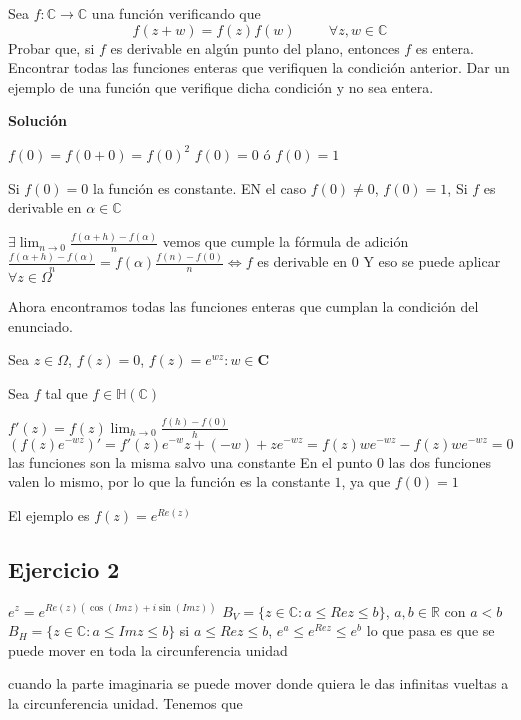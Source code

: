 \begin{ejer}
	Sea $f:\mathbb{C}\rightarrow\mathbb{C}$ una función verificando que
	$$ f(z+w) = f(z)f(w) \hspace{1cm} \forall z,w\in\mathbb{C} $$
	Probar que, si $f$ es derivable en algún punto del plano, entonces $f$ es entera. Encontrar todas las funciones enteras que verifiquen la condición anterior. Dar un ejemplo de una función que verifique dicha condición y no sea entera.
\end{ejer}


\textbf{Solución}

$f(0) = f(0+0) = f(0)^2$
$f(0)= 0$ ó $f(0) = 1$

Si $f(0)=0$ la función es constante.
EN el caso $f(0)\not =0$, $f(0)=1$, 
Si $f$ es derivable en $\alpha\in\mathbb{C}$

$\exists \lim_{n\rightarrow 0} \frac{f(\alpha+h)-f(\alpha)}{n}$
vemos que cumple la fórmula de adición 
$\frac{f(\alpha+h)-f(\alpha)}{n} = f(\alpha) \frac{f(n)-f(0)}{n} \Longleftrightarrow f$ es derivable en $0$
Y eso se puede aplicar $\forall z\in\Omega$

Ahora encontramos todas las funciones enteras que cumplan la condición del enunciado.

Sea $z\in\Omega$, $f(z)=0$, $f(z) = e^{wz} : w\in\mathbf{C}$

Sea $f$ tal que $f\in\mathbb{H}(\mathbb{C})$

$ f'(z) = f(z) \lim_{h\rightarrow 0} \frac{f(h)-f(0)}{h}$
$(f(z) e^{-wz})' = f'(z) e^{-w}z + (-w) +ze^{-wz} = f(z)we^{-wz} - f(z)we^{-wz} = 0$
las funciones son la misma salvo una constante
En el punto $0$ las dos funciones valen lo mismo, por lo que la función es la constante $1$, ya que $f(0)=1$


El ejemplo es $f(z) = e^{Re(z)}$


\subsection{Ejercicio 2}

$e^z = e^{Re(z) (\cos(Imz) + i\sin(Imz))}$
$B_V = \{ z\in\mathbb{C} : a\leq Rez \leq b \}$, $a,b\in\mathbb{R}$ con $a<b$
$B_H = \{ z\in\mathbb{C} : a\leq Imz \leq b \}$
si $a\leq Rez \leq b$, $e^a \leq e^{Rez} \leq e^b$
lo que pasa es que se puede mover en toda la circunferencia unidad

cuando la parte imaginaria se puede mover donde quiera le das infinitas vueltas a la circunferencia unidad. Tenemos que

